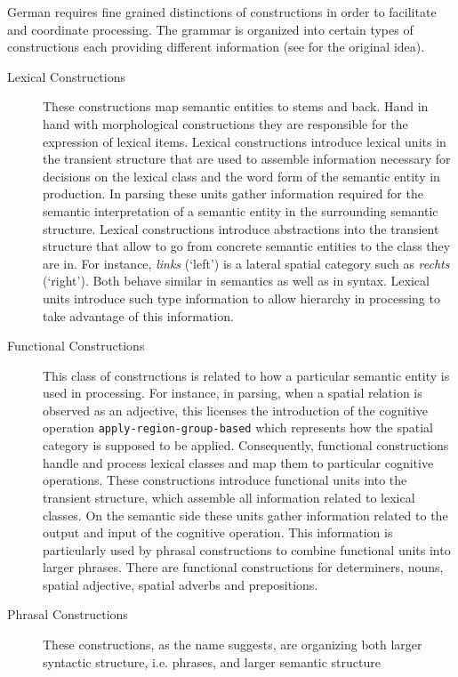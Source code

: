 German requires fine grained distinctions of constructions
in order to facilitate and coordinate processing. The grammar is 
organized into certain types of constructions each providing different information
(see \citealt{steels2011phrasal} for the original idea). 
\begin{description}
\item[Lexical Constructions] These constructions map semantic entities
to stems and back. Hand in hand with morphological constructions they
are responsible for the expression of lexical items. Lexical constructions
introduce lexical units in the transient structure that are used to assemble
information necessary for decisions on the lexical class and the word form 
of the semantic entity in production. In parsing these units gather information 
required for the semantic interpretation of a semantic entity in the 
surrounding semantic structure. Lexical constructions introduce abstractions
into the transient structure that allow to go from concrete semantic entities
to the class they are in. For instance, \textit{links} (`left') is a lateral spatial 
category such as \textit{rechts} (`right'). Both behave similar in semantics 
as well as in syntax. Lexical units introduce such type information
to allow hierarchy in processing to take advantage of this information.
\item[Functional Constructions] This class of constructions is related to
how a particular semantic entity is used in processing. For instance, in parsing,
when a spatial relation is observed as an adjective, this licenses the introduction 
of the cognitive operation {\footnotesize\tt apply-region-group-based} which represents how 
the spatial category is supposed to be applied. Consequently, functional constructions 
handle and process lexical classes and map them to particular cognitive operations.
These constructions introduce functional units into the transient structure, which
assemble all information related to lexical classes. On the semantic side
these units gather information related to the output and input of 
the cognitive operation. This information is particularly used by phrasal constructions
to combine functional units into larger phrases.
There are functional constructions for determiners, nouns, spatial adjective, spatial
adverbs and prepositions.
\item[Phrasal Constructions] These constructions, as the name suggests, are organizing both
larger syntactic structure, i.e. phrases, and larger semantic structure

\end{description}
